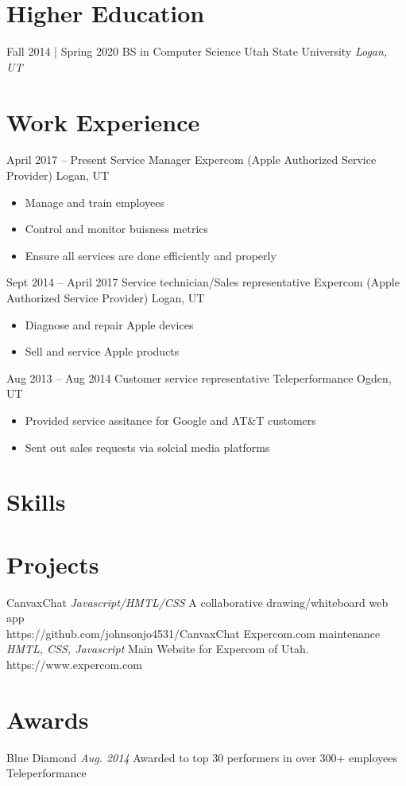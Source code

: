 \documentclass[letterpaper]{moderncv}        %
\begin{document}
\makecvtitle
    

\section{Higher Education}
\cventry
{Fall 2014 | Spring 2020}
{BS in Computer Science}
{Utah State University}
{}
{\textit{Logan, UT}}
{}
\section{Work Experience}
\cventry
{April 2017 -- Present}
{Service Manager}
{Expercom (Apple Authorized Service Provider)}
{Logan, UT}
{}
{\begin{itemize}%
	\item Manage and train employees
	\item Control and monitor buisness metrics
	\item Ensure all services are done efficiently and properly
	\end{itemize}}
\cventry
{Sept 2014 -- April 2017}
{Service technician/Sales representative}
{Expercom (Apple Authorized Service Provider)}
{Logan, UT}
{}
{\begin{itemize}%
	\item Diagnose and repair Apple devices
	\item Sell and service Apple products
	\end{itemize}}
\cventry
{Aug 2013 -- Aug 2014}
{Customer service representative}
{Teleperformance}
{Ogden, UT}
{}
{\begin{itemize}%
	\item Provided service assitance for Google and AT\&T customers
	\item Sent out sales requests via solcial media platforms
	\end{itemize}}
\section{Skills}
\section{Projects}
\cventry
{}
{CanvaxChat}
{}
{\textit{Javascript/HMTL/CSS}}
{}
{A collaborative drawing/whiteboard web app\\https://github.com/johnsonjo4531/CanvaxChat}
\vspace{1mm}
\cventry
{}
{Expercom.com maintenance}
{}
{\textit{HMTL, CSS, Javascript}}
{}
{Main Website for Expercom of Utah.\\https://www.expercom.com}
\vspace{1mm}
\section{Awards}
\cventry
{}
{Blue Diamond}
{}
{\textit{Aug. 2014}}
{}
{Awarded to top 30 performers in over 300+ employees\\Teleperformance}
\vspace{1mm}
\ 
\end{document}
